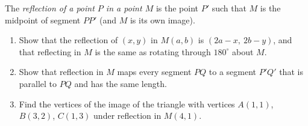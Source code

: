 The \emph{reflection of a point $P$ in a point $M$} is the point $P'$ such that $M$ is the midpoint of segment $PP'$ (and $M$ is its own image).
\begin{enumerate}
\item[(a)] Show that the reflection of $(x,y)$ in $M(a,b)$ is $(2a-x,\ 2b-y)$, and that reflecting in $M$ is the same as rotating through $180^\circ$ about $M$.
\item[(b)] Show that reflection in $M$ maps every segment $PQ$ to a segment $P'Q'$ that is parallel to $PQ$ and has the same length.
\item[(c)] Find the vertices of the image of the triangle with vertices $A(1,1)$, $B(3,2)$, $C(1,3)$ under reflection in $M(4,1)$.
\end{enumerate}
